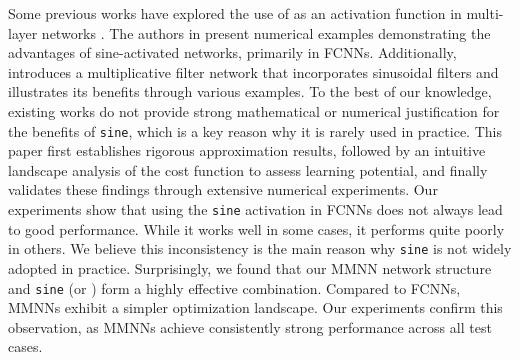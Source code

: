 

Some previous works have explored the use of \sine{} as an activation function in multi-layer networks \cite{doi:10.1137/19M1310050,novello2024tamingfrequencyfactorysinusoidal,2025arXiv250200869M,fathony2021multiplicative,doi:10.1137/21M144431X,NEURIPS2020_53c04118}. The authors in \cite{novello2024tamingfrequencyfactorysinusoidal,2025arXiv250200869M} present numerical examples demonstrating the advantages of sine-activated networks, primarily in FCNNs. Additionally, \cite{fathony2021multiplicative} introduces a multiplicative filter network that incorporates sinusoidal filters and illustrates its benefits through various examples.
To the best of our knowledge, existing works do not provide strong mathematical or numerical justification for the benefits of \texttt{sine}, which is a key reason why it is rarely used in practice.
This paper first establishes rigorous approximation results, followed by an intuitive landscape analysis of the cost function to assess learning potential, and finally validates these findings through extensive numerical experiments. Our experiments show that using the \texttt{sine} activation in FCNNs does not always lead to good performance. While it works well in some cases, it performs quite poorly in others. We believe this inconsistency is the main reason why \texttt{sine} is not widely adopted in practice.
Surprisingly, we found that our MMNN network structure and \texttt{sine} (or ) form a highly effective combination. Compared to FCNNs, MMNNs exhibit a simpler optimization landscape. Our experiments confirm this observation, as MMNNs achieve consistently strong performance across all test cases.




